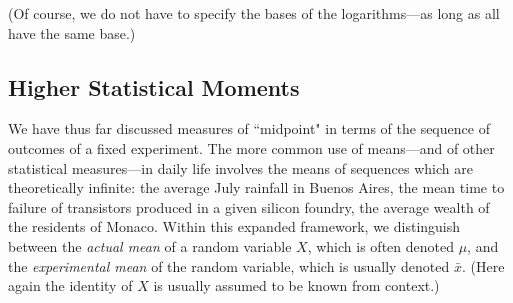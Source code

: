\smallskip

\noindent
(Of course, we do not have to specify the bases of the logarithms---as long as all have the same base.)
 
\subsection{Higher Statistical Moments}
\label{sec:mean-plus-moments}


We have thus far discussed measures of ``midpoint" in terms of the sequence of outcomes of a fixed experiment.  The more common use of means---and of other statistical measures---in daily life involves the means of sequences which are theoretically infinite: the average July rainfall in Buenos Aires, the mean time to failure of transistors produced in a given silicon foundry, the average wealth of the residents of Monaco.  Within this expanded framework, we distinguish between the {\em actual mean} of a random variable $X$, which is often denoted $\mu$, and the {\em experimental mean} of the random variable, which is usually denoted $\bar{x}$.  (Here again the identity of $X$ is usually assumed to be known from context.)

 

\smallskip

